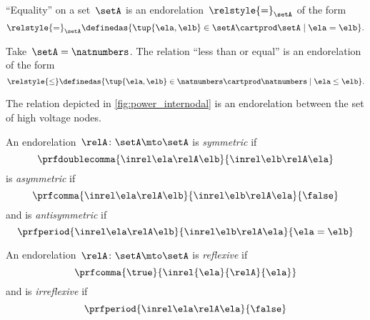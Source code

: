 \begin{example}
    ``Equality'' on a set~$\setA$ is an endorelation~$\relstyle{=}_\setA$ of the form
    \begin{equation}
        \relstyle{=}_\setA \definedas \{\tup{\ela,\elb}\in \setA\cartprod \setA \mid \ela=\elb\}.
    \end{equation}
\end{example}

\begin{example}
    Take~$\setA=\natnumbers$.
    The relation ``less than or equal'' is an endorelation of the form
    \begin{equation}
        \relstyle{\leq} \definedas  \{\tup{\ela,\elb}\in \natnumbers\cartprod \natnumbers\mid \ela \leq \elb\}.
    \end{equation}
\end{example}

\begin{example}
    The relation depicted in \cref{fig:power_internodal} is an endorelation between the set of high voltage nodes.
\end{example}

\begin{ctdefinition}
    \label{def:endo_sym_asym_antisym}
    An endorelation~$\relA\colon \setA\mto \setA$ is \emph{symmetric} if
    \begin{equation}
        \prfdoublecomma{
            \inrel \ela \relA \elb
        }{
            \inrel \elb \relA \ela
        }
    \end{equation}
    is \emph{asymmetric} if
    \begin{equation}
        \prfcomma{
            \inrel \ela \relA \elb
        }{
            \inrel \elb \relA \ela
        }{
            \false
        }
    \end{equation}
    and is \emph{antisymmetric} if
    \begin{equation}
        \prfperiod{
            \inrel \ela \relA \elb
        }{
            \inrel \elb \relA \ela
        }{
            \ela = \elb
        }
    \end{equation}
\end{ctdefinition}

\begin{ctdefinition}
    \label{def:endo_reflexive_irreflexive}
    An endorelation~$\relA\colon \setA\mto \setA$ is \emph{reflexive} if
    \begin{equation}
        \prfcomma{\true}{\inrel{\ela}{\relA}{\ela}}
    \end{equation}
    and is \emph{irreflexive} if
    \begin{equation}
        \prfperiod{
            \inrel \ela \relA \ela
        }{
            \false
        }
    \end{equation}
\end{ctdefinition}

